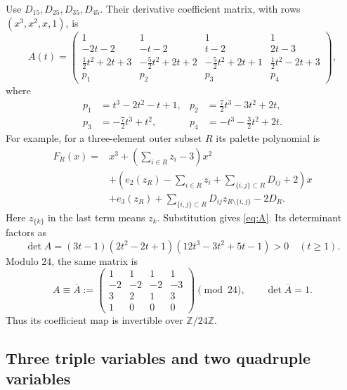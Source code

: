 \documentclass[11pt,a4paper]{article}
\theoremstyle{definition}
\newcommand{\Z}{\mathbb Z}
\begin{document}
Use $D_{15},D_{25},D_{35},D_{45}$. Their derivative coefficient matrix,
with rows $(x^3,x^2,x,1)$, is
\begin{equation}\label{eq:A}
 A(t)=
 \begin{pmatrix}
 1&1&1&1\\
 -2t-2&-t-2&t-2&2t-3\\
 \frac12t^2+2t+3&-\frac52t^2+2t+2&-\frac52t^2+2t+1&
                    \frac12t^2-2t+3\\
 p_1&p_2&p_3&p_4
 \end{pmatrix},
\end{equation}
where
\begin{align*}
 p_1&=t^3-2t^2-t+1,&
 p_2&=\frac72t^3-3t^2+2t,\\
 p_3&=-\frac72t^3+t^2,&
 p_4&=-t^3-\frac32t^2+2t.
\end{align*}
For example, for a three-element outer subset $R$ its palette polynomial is
\begin{align*}
 F_R(x)={}&x^3+\left(\sum_{i\in R}z_i-3\right)x^2\\
 &+\left(e_2(z_R)-\sum_{i\in R}z_i+\sum_{\{i,j\}\subset R}D_{ij}+2\right)x\\
 &+e_3(z_R)+\sum_{\{i,j\}\subset R}D_{ij}z_{R\setminus\{i,j\}}-2D_R.
\end{align*}
Here $z_{\{k\}}$ in the last term means $z_k$.
Substitution gives \eqref{eq:A}. Its determinant factors as
\begin{equation}\label{eq:detA}
 \det A=(3t-1)(2t^2-2t+1)(12t^3-3t^2+5t-1)>0
 \quad(t\ge1).
\end{equation}
Modulo $24$, the same matrix is
\begin{equation}\label{eq:Amod}
 A\equiv\overline A:=
 \begin{pmatrix}
 1&1&1&1\\
 -2&-2&-2&-3\\
 3&2&1&3\\
 1&0&0&0
 \end{pmatrix}\pmod{24},
 \qquad \det\overline A=1.
\end{equation}
Thus its coefficient map is invertible over $\Z/24\Z$.

\subsection{Three triple variables and two quadruple variables}
\end{document}
